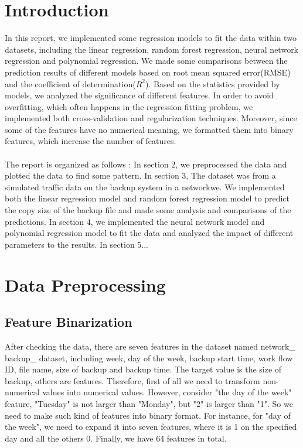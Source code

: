 \documentclass{article}
\begin{document}
\tableofcontents
\newpage
\section{Introduction}
In this report, we implemented some regression models to fit the data within two datasets, including the linear regression, random forest regression, neural network regression and polynomial regression. We made some comparisons between the prediction results of different models based on root mean squared error(RMSE) and the coefficient of determination($R^2$).
Based on the statistics provided by models, we analyzed the significance of different features. In order to avoid overfitting, which often happens in the regression fitting problem, we implemented both cross-validation and regularization techniques. Moreover, since some of the features have no numerical meaning, we formatted them into binary features, which increase the number of features. \\
\\
The report is organized as follows : In section 2, we preprocessed the data and plotted the data to find some pattern. In section 3, The dataset was from a simulated traffic data on the backup system in a networkwe. We implemented both the linear regression model and random forest regression model to predict the copy size of the backup file and made some analysis and comparisons of the predictions. In section 4, we implemented the neural network model and polynomial regression model to fit the data and analyzed the impact of different parameters to the results. In section 5...
\section{Data Preprocessing}
\subsection{Feature Binarization}
After checking the data, there are seven features in the dataset named network\_ backup\_ dataset, including week, day of the week, backup start time, work flow ID, file name, size of backup and backup time. The target value is the size of backup, others are features. Therefore, first of all we need to transform non-numerical values into numerical values. However, consider "the day of the week" feature, "Tuesday" is not larger than "Monday", but "2" is larger than "1". So we need to make such kind of features into binary format. For instance, for "day of the week", we need to expand it into seven features, where it is 1 on the specified day and all the others 0. Finally, we have 64 features in total.
\end{document}
